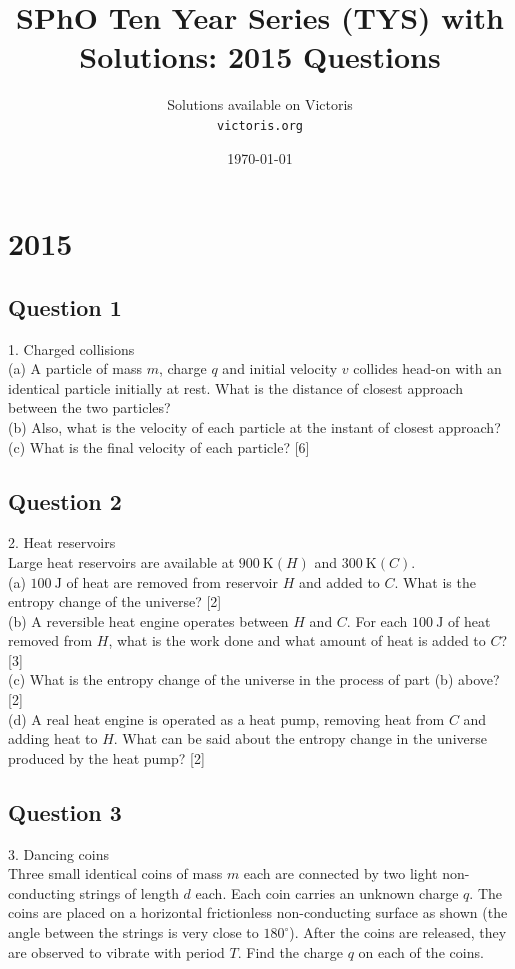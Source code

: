 \documentclass{article}
\title{SPhO Ten Year Series (TYS) with Solutions: 2015 Questions}
\author{
    Solutions available on Victoris\\
    \texttt{victoris.org}
}
\date{\today}
\begin{document}
\maketitle

\section{2015}

\subsection{Question 1}
1. Charged collisions \\
(a) A particle of mass $m$, charge $q$ and initial velocity $v$ collides head-on with an identical particle initially at rest. What is the distance of closest approach between the two particles? \\
(b) Also, what is the velocity of each particle at the instant of closest approach? \\
(c) What is the final velocity of each particle? [6]

\subsection{Question 2}
2. Heat reservoirs \\
Large heat reservoirs are available at $900 \mathrm{~K}(H)$ and $300 \mathrm{~K}(C)$. \\
(a) $100 \mathrm{~J}$ of heat are removed from reservoir $H$ and added to $C .$ What is the entropy change of the universe? [2] \\
(b) A reversible heat engine operates between $H$ and $C .$ For each $100 \mathrm{~J}$ of heat removed from $H$, what is the work done and what amount of heat is added to $C$? [3] \\
(c) What is the entropy change of the universe in the process of part (b) above? [2] \\
(d) A real heat engine is operated as a heat pump, removing heat from $C$ and adding heat to $H .$ What can be said about the entropy change in the universe produced by the heat pump? [2]

\subsection{Question 3}
3. Dancing coins \\
Three small identical coins of mass $m$ each are connected by two light non-conducting strings of length $d$ each. Each coin carries an unknown charge $q$. The coins are placed on a horizontal frictionless non-conducting surface as shown (the angle between the strings is very close to $180^{\circ}$). After the coins are released, they are observed to vibrate with period $T$. Find the charge $q$ on each of the coins.
\end{document}
